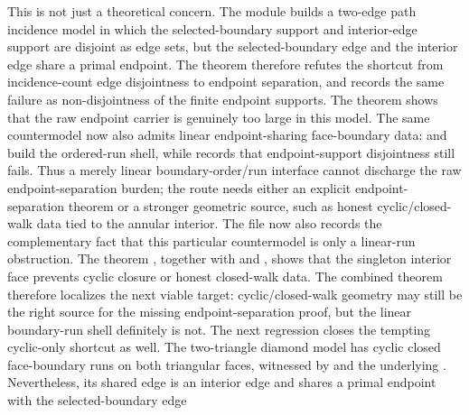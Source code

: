 \documentclass[11pt]{article}
\begin{document}
This is not just a theoretical concern.  The module
 builds a two-edge
path incidence model in which the selected-boundary support and interior-edge
support are disjoint as edge sets, but the selected-boundary edge and the
interior edge share a primal endpoint.  The theorem
therefore refutes the shortcut from incidence-count edge disjointness to
endpoint separation, and
 records the same failure as
non-disjointness of the finite endpoint supports.  The theorem
shows that the raw endpoint carrier is genuinely too large in this model.
The same countermodel now also admits linear endpoint-sharing face-boundary
data:  and
 build the ordered-run
shell, while
records that endpoint-support disjointness still fails.  Thus a merely linear
boundary-order/run interface cannot discharge the raw endpoint-separation
burden; the route needs either an explicit endpoint-separation theorem or a
stronger geometric source, such as honest cyclic/closed-walk data tied to the
annular interior.
The file now also records the complementary fact that this particular
countermodel is only a linear-run obstruction.  The theorem
, together
with  and
, shows that
the singleton interior face prevents cyclic closure or honest closed-walk
data.  The combined theorem
therefore localizes the next viable target: cyclic/closed-walk geometry may
still be the right source for the missing endpoint-separation proof, but the
linear boundary-run shell definitely is not.
The next regression closes the tempting cyclic-only shortcut as well.  The
two-triangle diamond model  has cyclic closed
face-boundary runs on both triangular faces, witnessed by
 and the underlying
.  Nevertheless, its shared edge is
an interior edge and shares a primal endpoint with the selected-boundary edge
\end{document}
